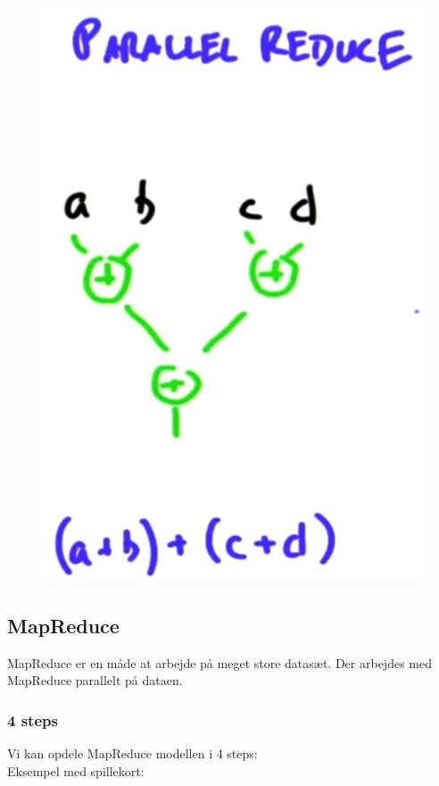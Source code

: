 \begin{figure}[H]
\begin{minipage}{.4\textwidth}
		\includegraphics[width=0.8\linewidth]{figs/aggregation/paraReduce}
		\label{paraReduce}
	\end{minipage}
\end{figure}

\subsection{MapReduce}
MapReduce er en måde at arbejde på meget store datasæt. Der arbejdes med MapReduce parallelt på dataen.

\subsubsection{4 steps}
Vi kan opdele MapReduce modellen i 4 steps:\\

Eksempel med spillekort:

